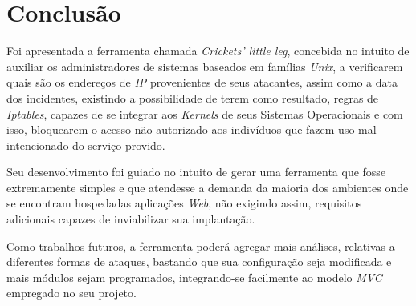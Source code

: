 \chapter*{Conclusão}

Foi apresentada a ferramenta chamada \textit{Crickets' little leg}, concebida no intuito de auxiliar os administradores de sistemas baseados em famílias \textit{Unix}, a verificarem quais são os endereços de \textit{IP} provenientes de seus atacantes, assim como a data dos incidentes, existindo a possibilidade de terem como resultado, regras de \textit{Iptables}, capazes de se integrar aos \textit{Kernels} de seus Sistemas Operacionais e com isso, bloquearem o acesso não-autorizado aos indivíduos que fazem uso mal intencionado do serviço provido.

Seu desenvolvimento foi guiado no intuito de gerar uma ferramenta que fosse extremamente simples e que atendesse a demanda da maioria dos ambientes onde se encontram hospedadas aplicações \textit{Web}, não exigindo assim, requisitos adicionais capazes de inviabilizar sua implantação.

Como trabalhos futuros, a ferramenta poderá agregar mais análises, relativas a diferentes formas de ataques, bastando que sua configuração seja modificada e mais módulos sejam programados, integrando-se facilmente ao modelo \textit{MVC} empregado no seu projeto.